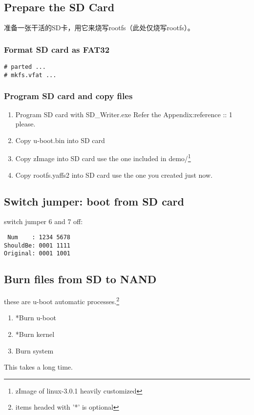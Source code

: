 \documentclass[11pt,a4paper]{article}
\begin{document}
\begin{CJK}{UTF8}{gbsn}
\subsection{Prepare the SD Card}
准备一张干活的SD卡，用它来烧写rootfs（此处仅烧写rootfs）。
\subsubsection{Format SD card as FAT32}
\begin{verbatim}
# parted ...
# mkfs.vfat ...
\end{verbatim}
\subsubsection{Program SD card and copy files}
\begin{enumerate}
\item Program SD card with SD\_Writer.exe\newline
Refer the Appendix:reference :: 1 please.
\item Copy u-boot.bin into SD card
\item Copy zImage into SD card\newline
use the one included in demo/\footnote{zImage of linux-3.0.1 heavily customized}
\item Copy rootfs.yaffs2 into SD card\newline
use the one you created just now.
\end{enumerate}

\subsection{Switch jumper: boot from SD card}
switch jumper 6 and 7 off:
\begin{verbatim}
 Num    : 1234 5678
ShouldBe: 0001 1111
Original: 0001 1001
\end{verbatim}

\subsection{Burn files from SD to NAND}
these are u-boot automatic processes.\footnote{items headed with '*' is optional}
\begin{enumerate}
\item *Burn u-boot
\item *Burn kernel
\item Burn system
\end{enumerate}
This takes a long time.


\end{CJK}
\end{document}
